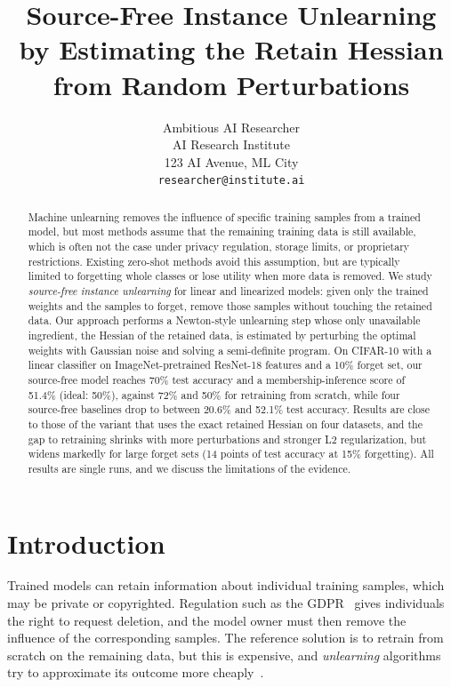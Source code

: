 \documentclass[10pt,twocolumn,letterpaper]{article}
\title{Source-Free Instance Unlearning by Estimating the Retain Hessian\\from Random Perturbations}
\author{Ambitious AI Researcher\\
AI Research Institute\\
123 AI Avenue, ML City\\
{\tt\small researcher@institute.ai}
}
\begin{document}
\maketitle

\begin{abstract}
Machine unlearning removes the influence of specific training samples from a trained model, but most methods assume that the remaining training data is still available, which is often not the case under privacy regulation, storage limits, or proprietary restrictions.
Existing zero-shot methods avoid this assumption, but are typically limited to forgetting whole classes or lose utility when more data is removed.
We study \emph{source-free instance unlearning} for linear and linearized models: given only the trained weights and the samples to forget, remove those samples without touching the retained data.
Our approach performs a Newton-style unlearning step whose only unavailable ingredient, the Hessian of the retained data, is estimated by perturbing the optimal weights with Gaussian noise and solving a semi-definite program.
On CIFAR-10 with a linear classifier on ImageNet-pretrained ResNet-18 features and a 10\% forget set, our source-free model reaches 70\% test accuracy and a membership-inference score of 51.4\% (ideal: 50\%), against 72\% and 50\% for retraining from scratch, while four source-free baselines drop to between 20.6\% and 52.1\% test accuracy.
Results are close to those of the variant that uses the exact retained Hessian on four datasets, and the gap to retraining shrinks with more perturbations and stronger L2 regularization, but widens markedly for large forget sets (14 points of test accuracy at 15\% forgetting).
All results are single runs, and we discuss the limitations of the evidence.
\end{abstract}

\section{Introduction}
\label{sec:intro}
Trained models can retain information about individual training samples, which may be private or copyrighted. Regulation such as the GDPR~\cite{gdpr2016} gives individuals the right to request deletion, and the model owner must then remove the influence of the corresponding samples. The reference solution is to retrain from scratch on the remaining data, but this is expensive, and \emph{unlearning} algorithms try to approximate its outcome more cheaply~\cite{cao2015towards,bourtoule2021machine,ginart2019making}.
\end{document}
